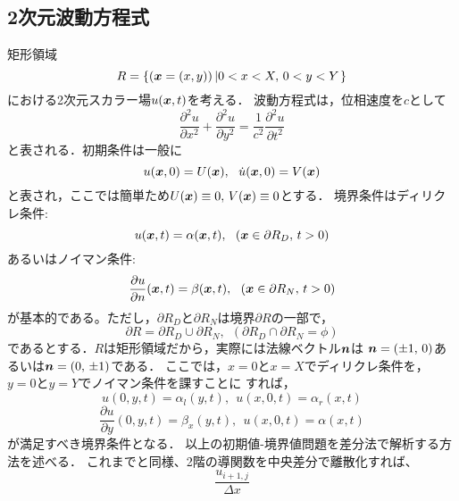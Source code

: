\documentclass[10pt,a4j,dvipdfmx]{jarticle}
\begin{document}
\subsection{2次元波動方程式}
矩形領域
\begin{equation}
	R=\left\{
		(\mbox{\boldmath $x$}=(x,y))
		\left|
		0< x <X, \,  0 < y < Y
		\right.
	\right\}
	\label{eqn:}
\end{equation}
における2次元スカラー場$u(\mbox{\boldmath $x$},t)$を考える．
波動方程式は，位相速度を$c$として
\begin{equation}
	\frac{\partial^2 u}{\partial x^2}
	+
	\frac{\partial^2 u}{\partial y^2}
	=
	\frac{1}{c^2}
	\frac{\partial^2 u}{\partial t^2}
	\label{eqn:wveq2D}
\end{equation}
と表される．初期条件は一般に
\begin{equation}
	u(\fat{x},0)=U(\fat{x}), \ \ 
	\dot{u}(\fat{x},0)=V(\fat{x})
	\label{eqn:IC_2D}
\end{equation}
と表され，ここでは簡単ため$U(\mbox{\boldmath $x$})\equiv 0, \, V(\mbox{\boldmath $x$})\equiv 0$とする．
境界条件はディリクレ条件:
\begin{equation}
	u(\fat{x},t) = \alpha (\fat{x},t), \ \ (\fat{x}\in \partial R_D,\, t>0)
	\label{eqn:}
\end{equation}
あるいはノイマン条件:
\begin{equation}
	\frac{\partial u}{\partial n}(\mbox{\boldmath $x$},t) = \beta (\mbox{\boldmath $x$},t), \ \ (\mbox{\boldmath $x$}\in \partial R_N,\, t>0)
	\label{eqn:}
\end{equation}
が基本的である。ただし，$\partial R_D$と$\partial R_N$は境界$\partial R$の一部で，
\begin{equation}
	\partial R
	=
	\partial R_D \cup \partial R_N 
	, \ \ 
	\left(
		\partial R_D \cap \partial R_N =\phi
	\right)
	\label{eqn:}
\end{equation}
であるとする．$R$は矩形領域だから，実際には法線ベクトル$\mbox{\boldmath $n$}$は
$\mbox{\boldmath $n$}=(\pm 1,\, 0 )$あるいは$\mbox{\boldmath $n$}=(0,\, \pm 1)$である．
ここでは，$x=0$と$x=X$でディリクレ条件を，$y=0$と$y=Y$でノイマン条件を課すことに
すれば，
\begin{equation}
	u(0,y,t)=\alpha_l(y,t), \ \ u(x,0,t)=\alpha_r(x,t)
	\label{eqn:}
\end{equation}
\begin{equation}
	\frac{\partial u}{\partial y}(0,y,t)=\beta_x(y,t), \ \ u(x,0,t)=\alpha(x,t)
	\label{eqn:}
\end{equation}
が満足すべき境界条件となる．
以上の初期値-境界値問題を差分法で解析する方法を述べる．
これまでと同様、2階の導関数を中央差分で離散化すれば、
\begin{equation}
	\frac{u_{i+1,j}}{\Delta x}
	\label{eqn:}
\end{equation}
\end{document}
